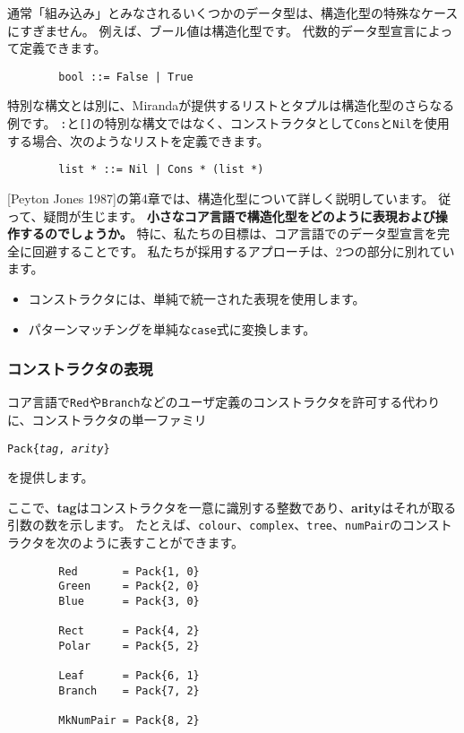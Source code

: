 \documentclass{jarticle}
\begin{document}
通常「組み込み」とみなされるいくつかのデータ型は、構造化型の特殊なケースにすぎません。
例えば、ブール値は構造化型です。
代数的データ型宣言によって定義できます。

\begin{verbatim}
        bool ::= False | True
\end{verbatim}

特別な構文とは別に、Mirandaが提供するリストとタプルは構造化型のさらなる例です。
\texttt{:}と\texttt{[]}の特別な構文ではなく、コンストラクタとして\texttt{Cons}と\texttt{Nil}を使用する場合、次のようなリストを定義できます。

\begin{verbatim}
        list * ::= Nil | Cons * (list *)
\end{verbatim}

[Peyton Jones 1987]の第4章では、構造化型について詳しく説明しています。
従って、疑問が生じます。
\textbf{小さなコア言語で構造化型をどのように表現および操作するのでしょうか。}
特に、私たちの目標は、コア言語でのデータ型宣言を完全に回避することです。
私たちが採用するアプローチは、2つの部分に別れています。

\begin{itemize}
	\item コンストラクタには、単純で統一された表現を使用します。
	\item パターンマッチングを単純な\texttt{case}式に変換します。
\end{itemize}

\subsubsection{コンストラクタの表現} \label{sec_1_1_4}

コア言語で\texttt{Red}や\texttt{Branch}などのユーザ定義のコンストラクタを許可する代わりに、コンストラクタの単一ファミリ
\begin{center}
	\texttt{Pack\{\textit{tag}, \textit{arity}\}}
\end{center}
を提供します。

ここで、\textbf{tag}はコンストラクタを一意に識別する整数であり、\textbf{arity}はそれが取る引数の数を示します。
たとえば、\texttt{colour}、\texttt{complex}、\texttt{tree}、\texttt{numPair}のコンストラクタを次のように表すことができます。
\begin{verbatim}
        Red       = Pack{1, 0}
        Green     = Pack{2, 0}
        Blue      = Pack{3, 0}

        Rect      = Pack{4, 2}
        Polar     = Pack{5, 2}

        Leaf      = Pack{6, 1}
        Branch    = Pack{7, 2}

        MkNumPair = Pack{8, 2}
\end{verbatim}
\end{document}
